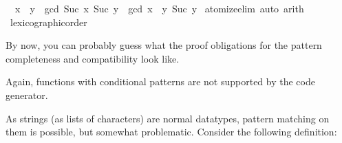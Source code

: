 \begin{isabellebody}
{}\ {}{}\ x\ {}\ y\ {}\ gcd\ {}Suc\ x{}\ {}Suc\ y{}\ {}\ gcd\ {}x\ {}\ y{}\ {}Suc\ y{}{}\isanewline
%
\isadelimproof
%
\endisadelimproof
%
\isatagproof
{}\isamarkupfalse%
\ {}atomize{}elim{}\ auto{}\ arith{}%
\endisatagproof
{\isafoldproof}%
%
\isadelimproof
\isanewline
%
\endisadelimproof
{}\isamarkupfalse%
%
\isadelimproof
\ %
\endisadelimproof
%
\isatagproof
{}\isamarkupfalse%
\ lexicographic{}order%
\endisatagproof
{\isafoldproof}%
%
\isadelimproof
%
\endisadelimproof
%
\begin{isamarkuptext}%
By now, you can probably guess what the proof obligations for the
  pattern completeness and compatibility look like. 

  Again, functions with conditional patterns are not supported by the
  code generator.%
\end{isamarkuptext}%
\isamarkuptrue%
%
\isamarkuptrue%
%
\begin{isamarkuptext}%
As strings (as lists of characters) are normal datatypes, pattern
  matching on them is possible, but somewhat problematic. Consider the
  following definition:

\end{isamarkuptext}
\noindent{} \\%
\\%
\hspace*{2ex}\\%
\begin{isamarkuptext}


\end{isamarkuptext}
\end{isabellebody}
